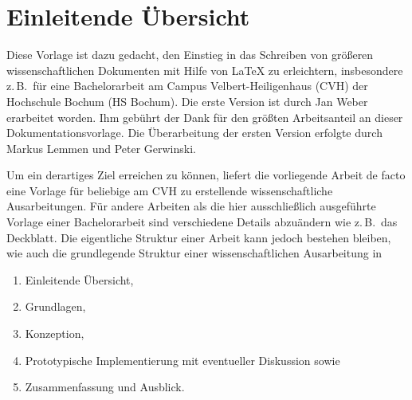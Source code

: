 %
%
%
\section{Einleitende Übersicht%
         \label{sec:Einleitung}}

Diese Vorlage ist dazu gedacht,
den Einstieg in das Schreiben von größeren wissenschaftlichen Dokumenten
mit Hilfe von \LaTeX{} zu erleichtern,
insbesondere z.\,B.~für eine Bachelorarbeit
am Campus Velbert-Heiligenhaus (CVH) der Hochschule Bochum (HS Bochum). 
Die erste Version ist durch Jan Weber erarbeitet worden.
Ihm gebührt der Dank für den größten Arbeitsanteil an dieser Dokumentationsvorlage.
Die Überarbeitung der ersten Version erfolgte durch Markus Lemmen und Peter Gerwinski. 

Um ein derartiges Ziel erreichen zu können,
liefert die vorliegende Arbeit de facto eine Vorlage
für beliebige am CVH zu erstellende wissenschaftliche Ausarbeitungen. 
Für andere Arbeiten als die hier ausschließlich ausgeführte
Vorlage einer Bachelorarbeit sind verschiedene Details abzuändern
wie z.\,B.\ das Deckblatt. 
Die eigentliche Struktur einer Arbeit kann jedoch bestehen bleiben,
wie auch die grundlegende Struktur einer wissenschaftlichen Ausarbeitung in 

\begin{enumerate}
  \item Einleitende Übersicht, 
  \item Grundlagen, 
  \item Konzeption, 
  \item Prototypische Implementierung mit eventueller Diskussion sowie
  \item Zusammenfassung und Ausblick. 
\end{enumerate}

